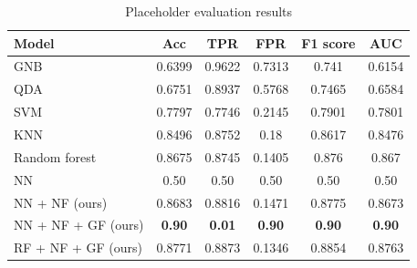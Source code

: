 \begin{table}[t]
\centering
\begin{tabular}{@{}lccccc@{}}
\toprule
\textbf{Model} & \textbf{Acc} & \textbf{TPR} & \textbf{FPR} & \textbf{F1 score} & \textbf{AUC} \\ \midrule
GNB             & 0.6399 & 0.9622 & 0.7313 & 0.741  & 0.6154 \\
QDA             & 0.6751 & 0.8937 & 0.5768 & 0.7465 & 0.6584 \\
SVM             & 0.7797 & 0.7746 & 0.2145 & 0.7901 & 0.7801 \\
KNN             & 0.8496 & 0.8752 & 0.18   & 0.8617 & 0.8476 \\
Random forest   & 0.8675 & 0.8745 & 0.1405 & 0.876  & 0.867 \\
NN              & 0.50   & 0.50   & 0.50   & 0.50   & 0.50 \\ \midrule
NN + NF (ours)  & 0.8683 & 0.8816 & 0.1471 & 0.8775 & 0.8673 \\
NN + NF + GF (ours) & \textbf{0.90} & \textbf{0.01} & \textbf{0.90} & \textbf{0.90} & \textbf{0.90} \\
RF + NF + GF (ours) & 0.8771 & 0.8873 & 0.1346 & 0.8854 & 0.8763 \\
\bottomrule
\end{tabular}
\caption{Placeholder evaluation results}
\label{tab:results}
\end{table}